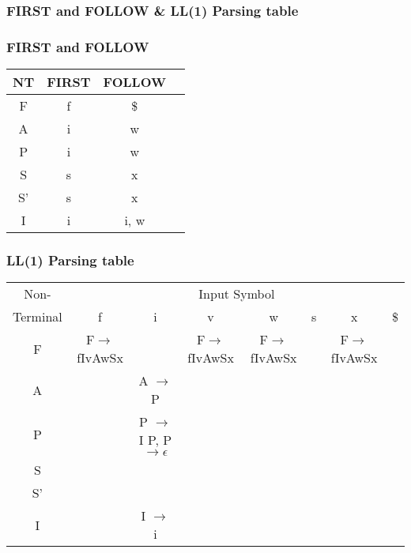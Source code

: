 \documentclass{article}
\begin{document}
\subsubsection{{\ttfamily FIRST} and {\ttfamily FOLLOW} \& LL(1) Parsing table}
\subsubsection*{{\ttfamily FIRST} and {\ttfamily FOLLOW}}
\begin{tabular}{|c|c|c|c|}
\hline
NT & FIRST & FOLLOW \\
\hline
\hline
F  & f & \$ \\
A  & i & w \\
P  & i & w \\
S  & s & x \\
S' & s & x \\
I  & i & i, w \\
\hline
\end{tabular}
\subsubsection*{LL(1) Parsing table}
\begin{tabular}{|c|c|c|c|c|c|c|c|}
\hline
Non- & \multicolumn{7}{c|}{Input Symbol}\\
\cline{2-8}
Terminal & f & i & v & w & s & x & \$ \\
\hline
\hline
F  & F$\rightarrow$fIvAwSx & &F$\rightarrow$fIvAwSx &F$\rightarrow$fIvAwSx & &F$\rightarrow$fIvAwSx & \\
\hline
A  & &  A $\rightarrow$ P  & & & & & \\
\hline
P  & & P $\rightarrow$ I P, P $\rightarrow \epsilon$ & & & & & \\
\hline
S  & & & & & & & \\
\hline
S' & & & & & & & \\
\hline
I  & & I $\rightarrow$ i & & & & & \\
\hline
\end{tabular}


\printindex
\end{document}
